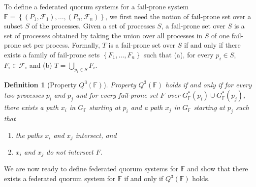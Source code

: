 \documentclass[11pt]{article}
\newtheorem{definition}{Definition}
\begin{document}
To define a federated quorum systems for a fail-prone system $\mathbb{F}=\left\{\left(P_1,\mathcal{F}_1\right),...,\left(P_n,\mathcal{F}_n\right)\right\}$, we first need the notion of fail-prone set over a subset $S$ of the processes. Given a set of processes $S$, a fail-prone set over $S$ is a set of processes obtained by taking the union over all processes in $S$ of one fail-prone set per process. Formally, $T$ is a fail-prone set over $S$ if and only if there exists a family of fail-prone sets $\left\{F_1,...,F_n\right\}$ such that (a), for every $p_i\in S$, $F_i\in \mathcal{F}_i$ and (b) $T=\bigcup_{p_i\in S} F_i$.

\begin{definition}[Property $Q^3(\mathbb{F})$]
  Property $Q^3(\mathbb{F})$ holds if and only if for every two processes $p_i$ and $p_j$ and for every fail-prone set $F$ over $G_\mathbb{F}^*(p_i)\cup G_\mathbb{F}^*(p_j)$, there exists a path $x_i$ in $G_\mathbb{F}$ starting at $p_i$ and a path $x_j$ in $G_\mathbb{F}$ starting at $p_j$ such that
  \begin{enumerate}
    \item the paths $x_i$ and $x_j$ intersect, and
    \item $x_i$ and $x_j$ do not intersect $F$.
  \end{enumerate}
\end{definition}

We are now ready to define federated quorum systems for $\mathbb{F}$ and show that there exists a federated quorum system for $\mathbb{F}$ if and only if $Q^3(\mathbb{F})$ holds.


\end{document}
